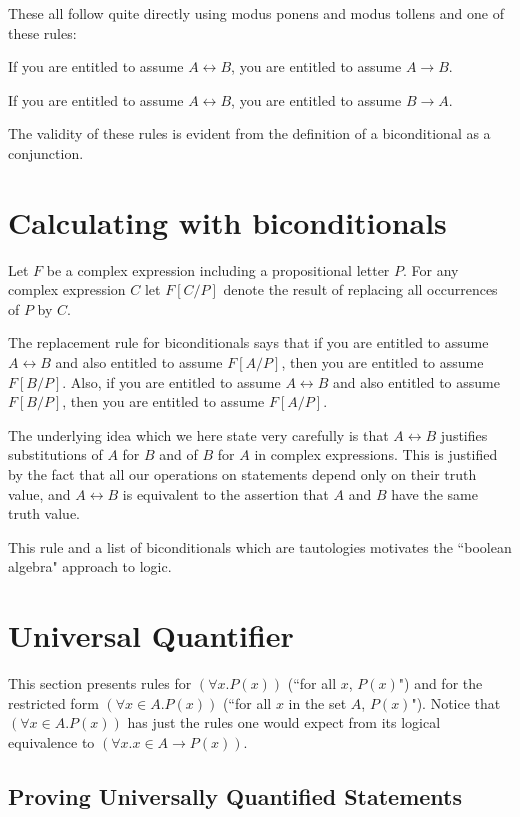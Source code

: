 \documentclass[12pt]{book}
\begin{document}
These all follow quite directly using modus ponens and modus tollens and one of these rules:

If you are entitled to assume $A \leftrightarrow B$, you are entitled to assume $A \rightarrow B$.

If you are entitled to assume $A \leftrightarrow B$, you are entitled to assume $B \rightarrow A$.

The validity of these rules is evident from the definition of a biconditional as a conjunction.

\section{Calculating with biconditionals}  Let $F$ be a complex expression including a propositional letter $P$.  For any complex expression $C$
let $F[C/P]$ denote the result of replacing all occurrences of $P$ by $C$.

The replacement rule for biconditionals says that if you are entitled to assume $A \leftrightarrow B$ and also entitled to assume $F[A/P]$,
then you are entitled to assume $F[B/P]$.    Also,  if you are entitled to assume $A \leftrightarrow B$ and also entitled to assume $F[B/P]$,
then you are entitled to assume $F[A/P]$.  

The underlying idea which we here state very carefully is that $A \leftrightarrow B$ justifies substitutions of $A$ for $B$ and of $B$ for $A$ in complex expressions.  This is justified by the fact that all our operations on statements depend only on their truth value, and $A \leftrightarrow B$ is equivalent to the assertion that $A$ and $B$ have the same truth value.

This rule and a list of biconditionals which are tautologies motivates the ``boolean algebra" approach to logic.

\section{Universal Quantifier}

This section presents rules for $(\forall x.P(x))$ (``for all $x$, $P(x)$") and for the restricted form $(\forall x \in A.P(x))$ (``for all $x$ in the set $A$, $P(x)$").  Notice that $(\forall x \in A.P(x))$ has just the rules one would expect from its logical equivalence to $(\forall x.x \in A \rightarrow P(x))$.

\subsection{Proving Universally Quantified Statements}
\end{document}
